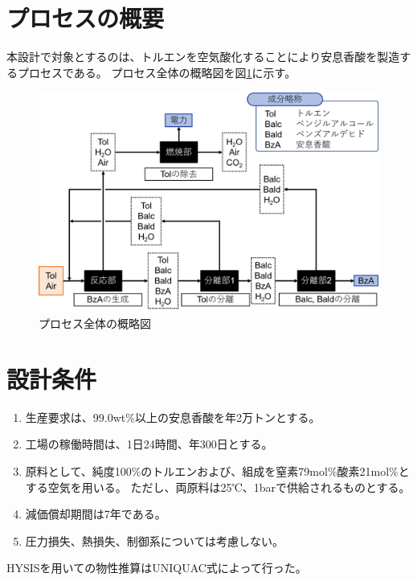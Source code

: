 \documentclass[a4j]{jsreport}
\begin{document}
\section{プロセスの概要}
本設計で対象とするのは、トルエンを空気酸化することにより安息香酸を製造するプロセスである。
プロセス全体の概略図を図\ref{プロセス全体のの概略図}に示す。
\begin{figure}[h]
    \label{プロセス全体のの概略図}
    \begin{center}
        \includegraphics[scale=0.7]{processOutline.png}
        \caption{プロセス全体の概略図}
    \end{center}
\end{figure}

\section{設計条件}
\begin{enumerate}
    \item 生産要求は、99.0wt\%以上の安息香酸を年2万トンとする。\\
    \item 工場の稼働時間は、1日24時間、年300日とする。\\
    \item 原料として、純度100\%のトルエンおよび、組成を窒素79mol\%酸素21mol\%とする空気を用いる。
             ただし、両原料は25℃、1barで供給されるものとする。\\
    \item 減価償却期間は7年である。\\
    \item 圧力損失、熱損失、制御系については考慮しない。
\end{enumerate}
HYSISを用いての物性推算はUNIQUAC式によって行った。
\end{document}
